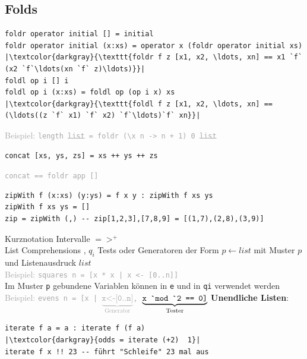 \documentclass{Zusammenfassung}
\begin{document}
\subsection{Folds}\label{subsec:folds}
\begin{verbatim}
foldr operator initial [] = initial
foldr operator initial (x:xs) = operator x (foldr operator initial xs)
|\textcolor{darkgray}{\texttt{foldr f z [x1, x2, \ldots, xn] == x1 `f` (x2 `f`\ldots(xn `f` z)\ldots)}}|
foldl op i [] i
foldl op i (x:xs) = foldl op (op i x) xs
|\textcolor{darkgray}{\texttt{foldl f z [x1, x2, \ldots, xn] == (\ldots((z `f` x1) `f` x2) `f`\ldots)`f` xn}}|
\end{verbatim}
\textcolor{darkgray}{Beispiel: \texttt{length \sout{list} = foldr (\textbackslash x n -> n + 1) 0 \sout{list}}}
\begin{multicols}{2}
\begin{verbatim}
concat [xs, ys, zs] = xs ++ ys ++ zs
\end{verbatim}
\columnbreak
\textcolor{darkgray}{\texttt{concat == foldr app []}}
\end{multicols}
\begin{verbatim}
zipWith f (x:xs) (y:ys) = f x y : zipWith f xs ys
zipWith f xs ys = []
zip = zipWith (,) -- zip[1,2,3],[7,8,9] = [(1,7),(2,8),(3,9)]
\end{verbatim}
Kurznotation Intervalle \haskellinline{[a..b]} $=>^+$ \haskellinline{[a, a+1, a+2, ..., b]}\\
List Comprehensions \haskellinline{[e | q1, ..., qm]}, $q_i$ Tests oder Generatoren der Form $p \leftarrow list$ mit Muster $p$ und Listenausdruck $list$\\
\textcolor{darkgray}{Beispiel: \texttt{squares n = [x * x | x <- [0..n]]}}\\
Im Muster \texttt{p} gebundene Variablen können in \texttt{e} und in \texttt{qi} verwendet werden\\
\textcolor{darkgray}{Beispiel: \texttt{evens n = [x | $\underbrace{\texttt{x<-[0..n]}}_\text{Generator}$, $\underbrace{\texttt{x \textasciigrave mod \textasciigrave 2 == 0]}}_\text{Tester}$}}
\textbf{Unendliche Listen}: 
\begin{verbatim}
iterate f a = a : iterate f (f a)
|\textcolor{darkgray}{odds = iterate (+2)  1}|
iterate f x !! 23 -- führt "Schleife" 23 mal aus
\end{verbatim}
\end{document}
